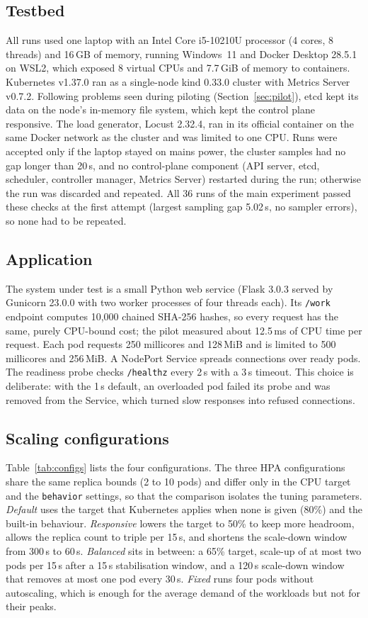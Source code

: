 \documentclass[conference,a4paper]{IEEEtran}
\begin{document}
\subsection{Testbed}
All runs used one laptop with an Intel Core i5-10210U processor (4 cores,
8 threads) and 16\,GB of memory, running Windows~11 and Docker Desktop 28.5.1
on WSL2, which exposed 8 virtual CPUs and 7.7\,GiB of memory to containers.
Kubernetes v1.37.0 ran as a single-node kind 0.33.0 cluster with
Metrics Server v0.7.2. Following problems seen during piloting (Section~\ref{sec:pilot}),
etcd kept its data on the node's in-memory file system, which kept the control
plane responsive. The load generator, Locust 2.32.4, ran in its official
container on the same Docker network as the cluster and was limited to one CPU.
Runs were accepted only if the laptop stayed on mains power, the cluster
samples had no gap longer than 20\,s, and no control-plane component
(API server, etcd, scheduler, controller manager, Metrics Server) restarted
during the run; otherwise the run was discarded and repeated. All 36 runs of
the main experiment passed these checks at the first attempt (largest sampling
gap 5.02\,s, no sampler errors), so none had to be repeated.

\subsection{Application}
The system under test is a small Python web service (Flask 3.0.3 served by
Gunicorn 23.0.0 with two worker processes of four threads each). Its
\texttt{/work} endpoint computes 10{,}000 chained SHA-256 hashes, so every
request has the same, purely CPU-bound cost; the pilot measured about
12.5\,ms of CPU time per request. Each pod requests 250 millicores and 128\,MiB
and is limited to 500 millicores and 256\,MiB. A NodePort Service spreads
connections over ready pods. The readiness probe checks \texttt{/healthz}
every 2\,s with a 3\,s timeout. This choice is deliberate: with the 1\,s default,
an overloaded pod failed its probe and was removed from the Service, which
turned slow responses into refused connections.

\subsection{Scaling configurations}
Table~\ref{tab:configs} lists the four configurations. The three HPA
configurations share the same replica bounds (2 to 10 pods) and differ only in
the CPU target and the \texttt{behavior} settings, so that the comparison
isolates the tuning parameters. \emph{Default} uses the target that
Kubernetes applies when none is given (80\%) and the built-in behaviour.
\emph{Responsive} lowers the target to 50\% to keep more headroom, allows the
replica count to triple per 15\,s, and shortens the scale-down window from
300\,s to 60\,s. \emph{Balanced} sits in between: a 65\% target, scale-up of at
most two pods per 15\,s after a 15\,s stabilisation window, and a 120\,s
scale-down window that removes at most one pod every 30\,s. \emph{Fixed} runs
four pods without autoscaling, which is enough for the average demand of the
workloads but not for their peaks.
\end{document}
